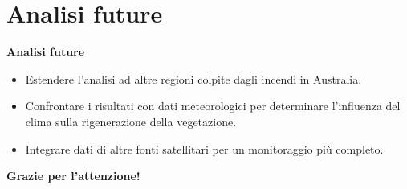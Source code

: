 \documentclass{beamer}
\begin{document}
\section{Analisi future}

\begin{frame}{\textbf{Analisi future}}
\begin{itemize}
    \item Estendere l'analisi ad altre regioni colpite dagli incendi in Australia.
    \item Confrontare i risultati con dati meteorologici per determinare l'influenza del clima sulla rigenerazione della vegetazione.
    \item Integrare dati di altre fonti satellitari per un monitoraggio più completo.
\end{itemize}
\end{frame}

\begin{frame}{}
\centering
\textbf{Grazie per l'attenzione!}
\end{frame}
\end{document}
